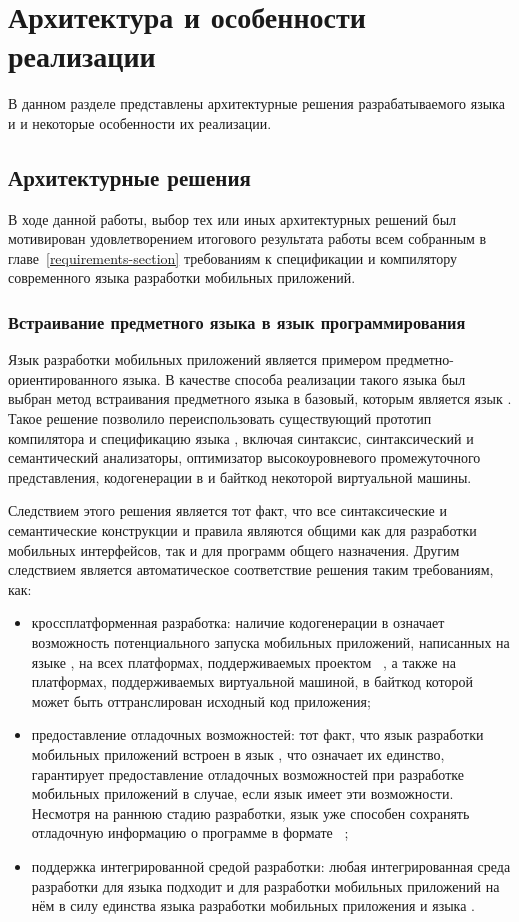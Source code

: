 \section{Архитектура и особенности реализации}
В данном разделе представлены архитектурные решения разрабатываемого языка и
и некоторые особенности их реализации.

\subsection{Архитектурные решения}
\label{section:architecture}
В ходе данной работы, выбор тех или иных архитектурных решений был
мотивирован удовлетворением итогового результата работы всем собранным
в главе~\ref{requirements-section} требованиям к спецификации и компилятору
современного языка разработки мобильных приложений.

\subsubsection{Встраивание  предметного языка в язык программирования }
Язык разработки мобильных приложений является примером
предметно-ориентированного языка. В качестве способа реализации такого языка
был выбран метод встраивания предметного языка в базовый, которым является
язык . Такое решение позволило переиспользовать существующий
прототип компилятора и спецификацию языка , включая синтаксис,
синтаксический и семантический анализаторы, оптимизатор высокоуровневого
промежуточного представления, кодогенерации в  и байткод
некоторой виртуальной машины.

Следствием этого решения является тот факт, что все синтаксические и
семантические конструкции и правила являются общими как для разработки
мобильных интерфейсов, так и для программ общего назначения. Другим
следствием является автоматическое соответствие решения таким требованиям,
как:
\begin{itemize}
	\item кроссплатформенная разработка: наличие кодогенерации в
	 означает возможность потенциального запуска мобильных
	приложений, написанных на языке , на всех платформах,
	поддерживаемых проектом ~\cite{llvm-homepage}, а также
	на платформах, поддерживаемых виртуальной машиной, в байткод которой
	может быть оттранслирован исходный код приложения;
	\item предоставление отладочных возможностей: тот факт, что язык
	разработки мобильных приложений встроен в язык , что
	означает их единство, гарантирует предоставление отладочных возможностей
	при разработке мобильных приложений в случае, если язык 
	имеет эти возможности. Несмотря на раннюю стадию разработки, язык
	 уже способен сохранять отладочную информацию о программе
	в формате ~\cite{dwarf-homepage};
	\item поддержка интегрированной средой разработки: любая интегрированная
	среда разработки для языка  подходит и для разработки
	мобильных приложений на нём в силу единства языка разработки мобильных
	приложения и языка .
\end{itemize}

